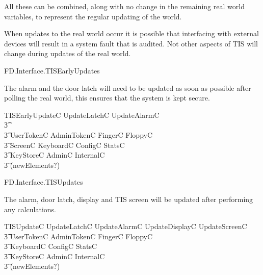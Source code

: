 All these can be combined, along with no change in the remaining
real world variables,
to represent the regular updating of the world.

When updates to the real world occur it is possible that interfacing
with external devices will result in a system fault that is
audited. Not other aspects of TIS will change during updates of the
real world.

\begin{traceunit}{FD.Interface.TISEarlyUpdates}
\end{traceunit}



The alarm and the door latch will need to be updated as soon as
possible after polling the real world, this ensures that the system is
kept secure.

\begin{zed}
        TISEarlyUpdateC  UpdateLatchC \land UpdateAlarmC 
\\ \t3        \land [~ RealWorldChangesC | screenC' = screenC \land
        displayC' = displayC ~]
\\ \t3 \land \Xi UserTokenC \land \Xi AdminTokenC \land \Xi FingerC \land
\Xi FloppyC \land 
\\ \t3 \Xi ScreenC \land \Xi KeyboardC \land \Xi ConfigC \land
\Xi StatsC  
\\ \t3 \land \Xi KeyStoreC \land \Xi AdminC \land \Xi InternalC
\\ \t3   \hide (newElements?) 
\end{zed}

\begin{traceunit}{FD.Interface.TISUpdates}
\end{traceunit}

The alarm, door latch, display and TIS screen will be updated after performing any
calculations. 

\begin{zed}
        TISUpdateC  UpdateLatchC \land UpdateAlarmC \land UpdateDisplayC \land UpdateScreenC
\\ \t3 \land \Xi UserTokenC \land \Xi AdminTokenC \land \Xi FingerC \land
\Xi FloppyC \land 
\\ \t3 \Xi KeyboardC \land \Xi ConfigC \land
\Xi StatsC  
\\ \t3 \land \Xi KeyStoreC \land \Xi AdminC \land \Xi InternalC
\\ \t3   \hide (newElements?) 
\end{zed}

